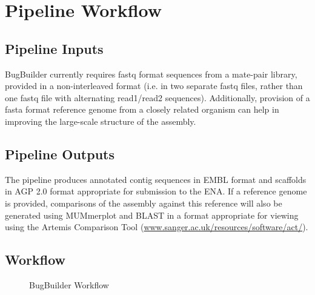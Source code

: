 \documentclass[a4paper,twoside,10pt]{article}
\begin{document}
\section{Pipeline Workflow}

\subsection{Pipeline Inputs}

BugBuilder currently requires fastq format sequences from a mate-pair library, provided in a
non-interleaved format (i.e. in two separate fastq files, rather than one fastq file with
alternating read1/read2 sequences). Additionally, provision of a fasta format reference genome from
a closely related organism can help in improving the large-scale structure of the assembly.

\subsection{Pipeline Outputs}

The pipeline produces annotated contig sequences in EMBL format and scaffolds in AGP 2.0 format
appropriate for submission to the ENA. If a reference genome is provided, comparisons of the assembly
against this reference will also be generated using MUMmerplot and BLAST in a format appropriate
for viewing using the Artemis Comparison Tool (\url{www.sanger.ac.uk/resources/software/act/}). 

\subsection{Workflow}

\begin{figure}[h]
\caption{BugBuilder Workflow}
\label{fig:BugBuilderWorkflow}
\end{figure}
\end{document}
